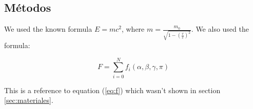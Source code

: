 \documentclass[a4paper,11pt]{article}
\begin{document}
\subsection{M\'etodos}

We used the known formula $E=mc^2$, where
$m=\frac{m_0}{\sqrt{1-\left(\frac{v}{c}\right)^2}}$. We also used the
formula:

\begin{equation}
  F=\sum_{i=0}^Nf_i(\alpha,\beta,\gamma,\pi) \label{eq:f}
\end{equation}

This is a reference to equation (\ref{eq:f}) which wasn't shown in
section \ref{sec:materiales}.
\end{document}
